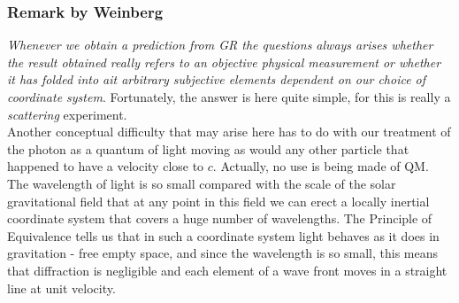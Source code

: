 		\subsubsection{Remark by Weinberg}
		\emph{Whenever we obtain a prediction from GR the questions always arises whether the result obtained really refers to an objective physical measurement or whether it has folded into ait arbitrary subjective elements dependent on our choice of coordinate system}. Fortunately, the answer is here quite simple, for this is really a \emph{scattering} experiment. \\
		Another conceptual difficulty that may arise here has to do with our treatment of the photon as a quantum of light moving as would any other particle that happened to have a velocity close to $c$. Actually, no use is being made of QM. The wavelength of light is so small compared with the scale of the solar gravitational field that at any point in this field we can erect a locally inertial coordinate system that covers a huge number of wavelengths. The Principle of Equivalence tells us that in such a coordinate system light behaves as it does in gravitation - free empty space, and since the wavelength is so small, this means that diffraction is negligible and each element of a wave front moves in a straight line at unit velocity.
		
		
